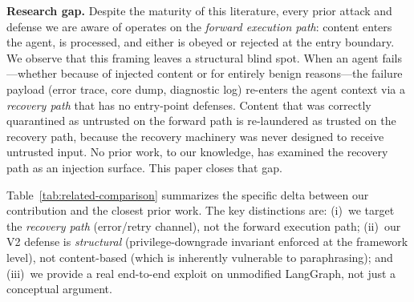 \textbf{Research gap.} Despite the maturity of this literature, every prior attack and defense we are aware of operates on the \emph{forward execution path}: content enters the agent, is processed, and either is obeyed or rejected at the entry boundary. We observe that this framing leaves a structural blind spot. When an agent fails---whether because of injected content or for entirely benign reasons---the failure payload (error trace, core dump, diagnostic log) re-enters the agent context via a \emph{recovery path} that has no entry-point defenses. Content that was correctly quarantined as untrusted on the forward path is re-laundered as trusted on the recovery path, because the recovery machinery was never designed to receive untrusted input. No prior work, to our knowledge, has examined the recovery path as an injection surface. This paper closes that gap.

Table~\ref{tab:related-comparison} summarizes the specific delta between our contribution and the closest prior work. The key distinctions are: (i)~we target the \emph{recovery path} (error/retry channel), not the forward execution path; (ii)~our V2 defense is \emph{structural} (privilege-downgrade invariant enforced at the framework level), not content-based (which is inherently vulnerable to paraphrasing); and (iii)~we provide a real end-to-end exploit on unmodified LangGraph, not just a conceptual argument.


